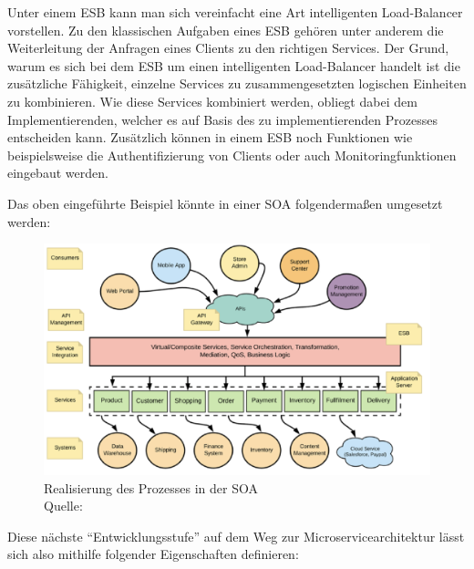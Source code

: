 Unter einem \ac{ESB} kann man sich vereinfacht eine Art intelligenten Load-Balancer vorstellen. Zu den klassischen Aufgaben eines \ac{ESB} gehören unter anderem die Weiterleitung der Anfragen eines Clients zu den richtigen Services. Der Grund, warum es sich bei dem \ac{ESB} um einen intelligenten Load-Balancer handelt ist die zusätzliche Fähigkeit, einzelne Services zu zusammengesetzten logischen Einheiten zu kombinieren. Wie diese Services kombiniert werden, obliegt dabei dem Implementierenden, welcher es auf Basis des zu implementierenden Prozesses entscheiden kann. Zusätzlich können in einem \ac{ESB} noch Funktionen wie beispielsweise die Authentifizierung von Clients oder auch Monitoringfunktionen eingebaut werden.

Das oben eingeführte Beispiel könnte in einer \ac{SOA} folgendermaßen umgesetzt werden:
\begin{figure}[h]
	\centering
	\includegraphics[width=1.0\linewidth]{img/abbildung_soa.png}
	\caption[SOA-Architektur]{Realisierung des Prozesses in der SOA\\ Quelle: \cite[S. 6 Figure 1-6]{microservice_enterprise}}
\end{figure}

Diese nächste \enquote{Entwicklungsstufe} auf dem Weg zur Microservicearchitektur lässt sich also mithilfe folgender Eigenschaften definieren:

